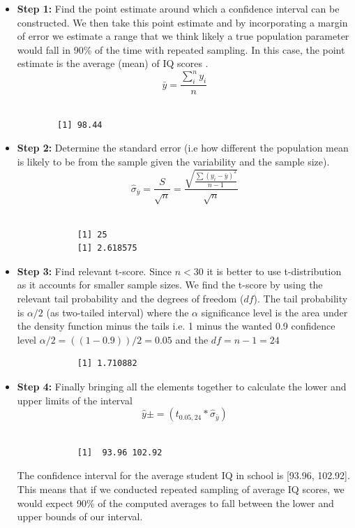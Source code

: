 \documentclass[12pt,letterpaper]{article}
\begin{document}
\noindent
\begin{itemize}
	\item \textbf{Step 1: } Find the point estimate around which a confidence interval can be constructed. We then take this point estimate and by incorporating a margin of error we estimate a range that we think likely a true population parameter would fall in 90\% of the time with repeated sampling. In this case, the point estimate is the average (mean) of IQ scores . 
		\begin{equation}
		\bar{y} = \frac{\sum_{i}^{n}y_i}{n}
		\end{equation} 
		\ 
		\begin{verbatim}
		[1] 98.44
		\end{verbatim} 
	\item \textbf{Step 2: } Determine the standard error (i.e how different the population mean is likely to be from the sample given the variability and the sample size). 
		\begin{equation}
			\hat{\sigma}_{\bar{y}} = \frac{S}{\sqrt{n}} = \frac{\sqrt{\frac{\sum (y_i - 	\bar{y})^2}{n-1}}}{\sqrt{n}}
		\end{equation}
		\
		\begin{verbatim}
			[1] 25
			[1] 2.618575
		\end{verbatim}
	\item \textbf{Step 3: } Find relevant t-score. Since $n<30$  it is better to use t-distribution as it accounts for smaller sample sizes. We find the t-score by using the relevant tail probability and the degrees of freedom ($df$). The tail probability is $\alpha/2$ (as two-tailed interval) where the $\alpha$ significance level is the area under the density function minus the tails i.e. 1 minus the wanted 0.9 confidence level  $\alpha/2 = ((1-0.9))/2 = 0.05$  and the $df=n-1=24$ 
		\
		\begin{verbatim}
			[1] 1.710882
		\end{verbatim}
	\item \textbf{Step 4: } Finally bringing all the elements together to calculate the lower and upper limits of the interval
		\begin{equation}
			\hat{y} \pm = (t_{0.05,24} * \hat{\sigma}_{\bar{y}}) 
		\end{equation}
		\
		\begin{verbatim}
			[1]  93.96 102.92
		\end{verbatim}
		The confidence interval for the average student IQ in school is [93.96, 102.92]. 
		This means that if we conducted repeated sampling of average IQ scores, we would expect 90\% of the computed averages to fall between the lower and upper bounds of our interval. 
\end{itemize}
\end{document}
